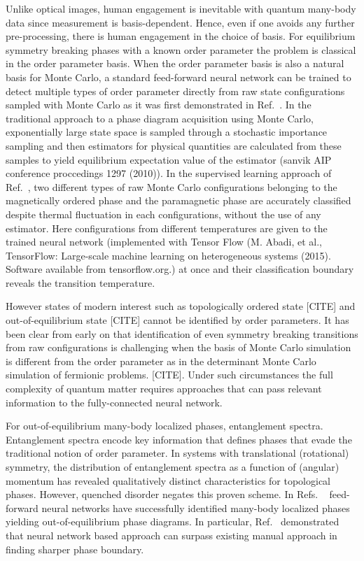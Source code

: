\documentclass[aps,prb,floatfix,amsmath,amssymb,amsfonts,10pt,floatfix,longbibliography]{revtex4-1}
\begin{document}
Unlike optical images,  human engagement is inevitable with quantum many-body data since measurement is basis-dependent. Hence, even if one avoids any further pre-processing, there is human engagement in the choice of basis. For equilibrium symmetry breaking phases with a known order parameter the problem is classical in the order parameter basis. When the order parameter basis is also a natural basis for Monte Carlo, a standard feed-forward neural network can be trained to detect multiple types of order parameter directly from raw state configurations sampled with Monte Carlo as it was first demonstrated in
Ref.~\cite{Carrasquilla2017a}. In the traditional approach to a phase diagram acquisition using Monte Carlo, exponentially large state space is sampled through a stochastic importance sampling and then estimators for physical quantities are calculated from these samples to yield equilibrium expectation value of the estimator
(sanvik AIP conference proccedings 1297 (2010)).
In the supervised learning approach of Ref.~\cite{Carrasquilla2017a}, two different types of raw Monte Carlo configurations belonging to the magnetically ordered phase and the paramagnetic phase are accurately classified despite thermal fluctuation in each configurations, without the use of any estimator. Here configurations from different temperatures are given to the trained neural network (implemented with Tensor Flow (M. Abadi, et al., TensorFlow: Large-scale machine learning on heterogeneous systems (2015).
Software available from tensorflow.org.) at once and their classification boundary reveals the transition temperature. 

However states of modern interest such as topologically ordered state [CITE] and out-of-equilibrium state [CITE] cannot be identified by order parameters. It has been clear from early on that identification of even  symmetry breaking transitions from raw configurations is challenging when  the basis of Monte Carlo simulation is different from the order parameter as in the determinant Monte Carlo simulation of fermionic problems. [CITE]. Under such circumstances the full complexity of quantum matter requires approaches that can pass relevant information to the fully-connected neural network. 

For out-of-equilibrium many-body localized phases, entanglement spectra. 
Entanglement spectra\cite{Li2008} encode key information that defines phases that evade the traditional
notion of order parameter. In systems with translational (rotational) symmetry, the distribution of
entanglement spectra as a function of (angular) momentum has revealed qualitatively distinct characteristics
for topological phases\cite{Li2008,Thomale2010,Qi2012}. However, quenched disorder negates this proven scheme. In Refs. ~\cite{Nieuwenburg2017,Schindler2017,Venderley2017} feed-forward neural networks have successfully identified  many-body localized phases yielding out-of-equilibrium phase diagrams. 
In particular, Ref.~\cite{Venderley2017} demonstrated that neural network based approach can surpass existing manual approach in finding sharper phase boundary. 
\end{document}
